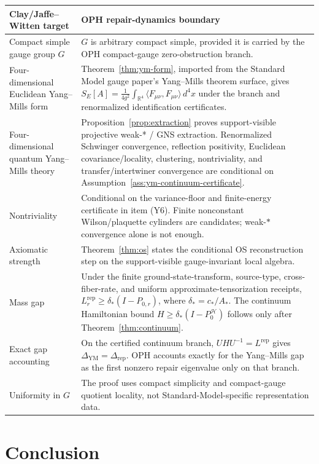 \documentclass[11pt]{article}
\numberwithin{equation}{section}
\theoremstyle{remark}
\newcommand{\YM}{\mathrm{YM}}
\newcommand{\Rep}{\mathrm{rep}}
\newcommand{\Hcal}{\mathcal H}
\newcommand{\R}{\mathbb R}
\begin{document}
\begin{longtable}{@{}L{0.30\textwidth}L{0.62\textwidth}@{}}
\toprule
Clay/Jaffe--Witten target & OPH repair-dynamics boundary \\
\midrule
\endhead
Compact simple gauge group \(G\) & \(G\) is arbitrary compact simple, provided it is carried by the OPH compact-gauge zero-obstruction branch. \\
Four-dimensional Euclidean Yang--Mills form & Theorem~\ref{thm:ym-form}, imported from the Standard Model gauge paper's Yang--Mills theorem surface, gives \(S_E[A]=\frac{1}{4g^2}\int_{\R^4}\langle F_{\mu\nu},F_{\mu\nu}\rangle\,d^4x\) under the branch and renormalized identification certificates. \\
Four-dimensional quantum Yang--Mills theory & Proposition~\ref{prop:extraction} proves support-visible projective weak-* / GNS extraction. Renormalized Schwinger convergence, reflection positivity, Euclidean covariance/locality, clustering, nontriviality, and transfer/intertwiner convergence are conditional on Assumption~\ref{ass:ym-continuum-certificate}. \\
Nontriviality & Conditional on the variance-floor and finite-energy certificate in item (Y6). Finite nonconstant Wilson/plaquette cylinders are candidates; weak-\(*\) convergence alone is not enough. \\
Axiomatic strength & Theorem~\ref{thm:os} states the conditional OS reconstruction step on the support-visible gauge-invariant local algebra. \\
Mass gap & Under the finite ground-state-transform, source-type, cross-fiber-rate, and uniform approximate-tensorization receipts, \(L_r^{\Rep}\ge\delta_*(I-P_{0,r})\), where \(\delta_*=c_*/A_*\). The continuum Hamiltonian bound \(H\ge\delta_*(I-P_0^{\Hcal})\) follows only after Theorem~\ref{thm:continuum}. \\
Exact gap accounting & On the certified continuum branch, \(UHU^{-1}=L^{\mathrm{rep}}\) gives \(\Delta_{\YM}=\Delta_{\mathrm{rep}}\). OPH accounts exactly for the Yang--Mills gap as the first nonzero repair eigenvalue only on that branch. \\
Uniformity in \(G\) & The proof uses compact simplicity and compact-gauge quotient locality, not Standard-Model-specific representation data. \\
\bottomrule
\end{longtable}

\section{Conclusion}
\end{document}
